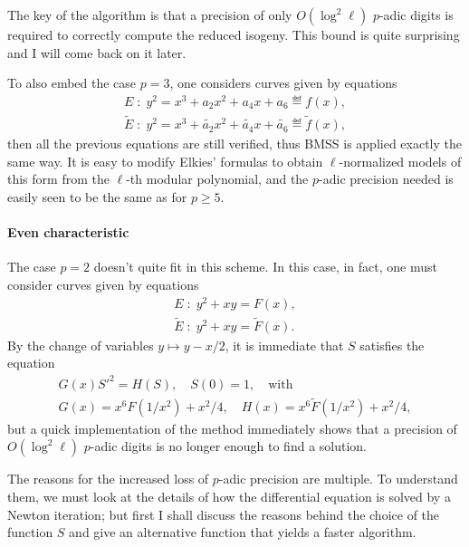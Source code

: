 \documentclass{article}
\begin{document}
The key of the algorithm is that a precision of only $O(\log^2\ell)$
$p$-adic digits is required to correctly compute the reduced
isogeny. This bound is quite surprising and I will come back on it
later.

To also embed the case $p=3$, one considers curves given by equations
\begin{equation}
\label{eq:6}
  \begin{gathered}
    E \;:\; y^2 = x^3 + a_2x^2 + a_4x + a_6 \eqdef f(x),\\
    \tilde{E} \;:\; y^2 = x^3 + \tilde{a_2}x^2 + \tilde{a_4}x + \tilde{a_6} \eqdef \tilde{f}(x),
  \end{gathered}
\end{equation}
then all the previous equations are still verified, thus BMSS is
applied exactly the same way. It is easy to modify Elkies' formulas to
obtain $\ell$-normalized models of this form from the $\ell$-th
modular polynomial, and the $p$-adic precision needed is easily seen
to be the same as for $p\ge5$.

\paragraph{Even characteristic}
The case $p=2$ doesn't quite fit in this scheme. In this case, in fact, one must
consider curves given by equations
\begin{equation}
  \label{eq:9}
  \begin{gathered}
    E \;:\; y^2 + xy = F(x),\\
    \tilde{E} \;:\; y^2 + xy = \tilde{F}(x).
  \end{gathered}
\end{equation}
By the change of variables $y\mapsto y-x/2$, it is immediate that $S$
satisfies the equation
\begin{equation}
  \label{eq:7}
  \begin{gathered}
    G(x){S'}^2 = H(S), \quad S(0) = 1,\quad\text{with}\\
    G(x) = x^6F(1/x^2) + x^2/4, \quad H(x) = x^6\tilde{F}(1/x^2) + x^2/4,
  \end{gathered}
\end{equation}
but a quick implementation of the method immediately shows that a
precision of $O(\log^2\ell)$ $p$-adic digits is no longer enough to
find a solution.

The reasons for the increased loss of $p$-adic precision are
multiple. To understand them, we must look at the details of how the
differential equation is solved by a Newton iteration; but first I
shall discuss the reasons behind the choice of the function $S$ and
give an alternative function that yields a faster algorithm.
\end{document}
